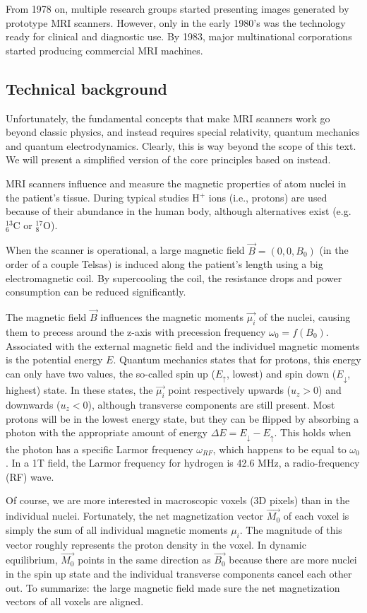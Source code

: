 From 1978 on, multiple research groups started presenting images generated by
prototype MRI scanners. However, only in the early 1980's was the technology 
ready for clinical and diagnostic use. By 1983, major multinational corporations
started producing commercial MRI machines.

\subsection{Technical background}
Unfortunately, the fundamental concepts that make MRI scanners work go beyond
classic physics, and instead requires special relativity, quantum mechanics and
quantum electrodynamics. Clearly, this is way beyond the scope of this text. We
will present a simplified version of the core principles based on
\cite{suetens} instead.

MRI scanners influence and measure the magnetic properties of atom nuclei in the
patient's tissue. During typical studies H$^+$ ions (i.e., protons) are used
because of their abundance in the human body, although alternatives exist
(e.g. ${}^{13}_6$C or ${}^{17}_8$O).

When the scanner is operational, a large magnetic field $\vec{B} = (0,0,B_0)$
(in the order of a couple Telsas) is induced along the patient's length using a
big electromagnetic coil. By supercooling the coil, the resistance drops and
power consumption can be reduced significantly.

The magnetic field $\vec{B}$ influences the magnetic moments $\vec{\mu_i}$ of
the nuclei, causing them to precess around the z-axis with precession frequency
$\omega_0 = f(B_0)$. Associated with the external magnetic field and the
individuel magnetic moments is the potential energy $E$. Quantum mechanics
states that for protons, this energy can only have two values, the so-called
spin up ($E_\uparrow$, lowest) and spin down ($E_\downarrow$, highest) state. In
these states, the $\vec{\mu_i}$ point respectively upwards ($u_z > 0$) and
downwards ($u_z < 0$), although transverse components are still present. Most
protons will be in the lowest energy state, but they can be flipped by absorbing
a photon with the appropriate amount of energy $\Delta E = E_\downarrow -
E_\uparrow$. This holds when the photon has a specific Larmor frequency
$\omega_{RF}$, which happens to be equal to $\omega_0$. In a 1T field, the
Larmor frequency for hydrogen is 42.6 MHz, a radio-frequency (RF) wave.

Of course, we are more interested in macroscopic voxels (3D pixels) than in the
individual nuclei. Fortunately, the net magnetization vector $\vec{M_0}$ of each
voxel is simply the sum of all individual magnetic moments $\mu_i$. The
magnitude of this vector roughly represents the proton density in the voxel. In
dynamic equilibrium, $\vec{M_0}$ points in the same direction as $\vec{B_0}$
because there are more nuclei in the spin up state and the individual transverse
components cancel each other out. To summarize: the large magnetic field made
sure the net magnetization vectors of all voxels are aligned. 

